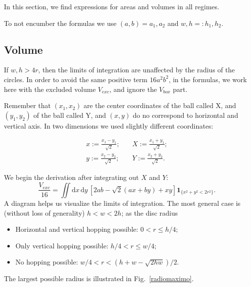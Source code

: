 \documentclass[superscriptaddress,pre,reprint,showpacs,twocolumn]{revtex4-1}
\newcommand{\defeq}{:=}
\newcommand{\rd}[1]{\mathrm{d}{#1} \,}
\newcommand{\indicatorsymbol}{\mathbf{1}}
\newcommand{\indicator}[1]{\indicatorsymbol_{ \{   #1 \} } }
\begin{document}
In this section, we find expressions for areas and volumes in all 
regimes.

To not encumber  the formulas we use  $(a , b)  = a_1 , a_2 $
and $w,h =: h_1, h_2 $.


\subsection{Volume}\label{app:volume2d}


If $w, h > 4r$, then the limits of integration
are unaffected by the radius of the circles.
In order to avoid the same positive term $16a^2b^2$, 
in the formulas, we work here with
the excluded volume $V_{exc}$, and ignore the  $V_{box}$ part.

Remember that $(x_1, x_2)$ are the center coordinates of the
ball called X, and $(y_1, y_2)$ of the ball called Y,
and $(x,y)$  do no correspond to horizontal and vertical axis.
In two dimensions we used slightly different coordinates:

\begin{equation}\label{cambiocoor2d}
  \begin{split}
 x  \defeq \frac{x_1 - y_1}{\sqrt{2}};  &
\quad X  \defeq \frac{x_1 + y_1}{\sqrt{2}};  \\
 y  \defeq \frac{x_2 - y_2}{\sqrt{2}}; & 
\quad Y  \defeq \frac{x_2 + y_2}{\sqrt{2}}.
  \end{split}
\end{equation}

We begin the derivation after integrating out $X$ and $Y$:
\begin{equation}\label{volgral2d}
\frac{V_{exc}}{16}  =\iint \rd x \rd y \left[ 2ab-\sqrt{2}(ax+by)+x y \right]
\indicator{x^2+y^2 < 2r^2 }.
\end{equation}
A diagram helps us visualize the limits of integration. The most general
case is (without loss of generality) $h < w < 2h$; as the disc radius 
\begin{itemize}
\item Horizontal and vertical hopping possible: $0 <r \leq h/4$;
\item Only vertical hopping possible: $h/4 < r \leq w/4$;
\item No hopping possible: $w/4 < r < (h+w - \sqrt{2hw}) / 2$.
\end{itemize}
The largest possible radius is illustrated in Fig.~\ref{radiomaximo}.
\end{document}

